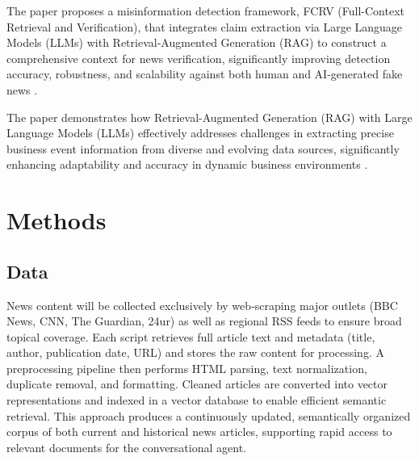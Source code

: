 \documentclass[fleqn,moreauthors,10pt]{ds_report}
\begin{document}
    The paper proposes a misinformation detection framework, FCRV (Full-Context Retrieval and Verification), that integrates claim extraction via Large Language Models (LLMs) with Retrieval-Augmented Generation (RAG) to construct a comprehensive context for news verification, significantly improving detection accuracy, robustness, and scalability against both human and AI-generated fake news \cite{10826000}.

    The paper demonstrates how Retrieval-Augmented Generation (RAG) with Large Language Models (LLMs) effectively addresses challenges in extracting precise business event information from diverse and evolving data sources, significantly enhancing adaptability and accuracy in dynamic business environments \cite{ARSLAN20244534}.



\section*{Methods}



\subsection*{Data}

News content will be collected exclusively by web‑scraping major outlets (BBC News, CNN, The Guardian, 24ur) as well as regional RSS feeds to ensure broad topical coverage. Each script retrieves full article text and metadata (title, author, publication date, URL) and stores the raw content for processing. A preprocessing pipeline then performs HTML parsing, text normalization, duplicate removal, and formatting. Cleaned articles are converted into vector representations and indexed in a vector database to enable efficient semantic retrieval. This approach produces a continuously updated, semantically organized corpus of both current and historical news articles, supporting rapid access to relevant documents for the conversational agent.
\end{document}
